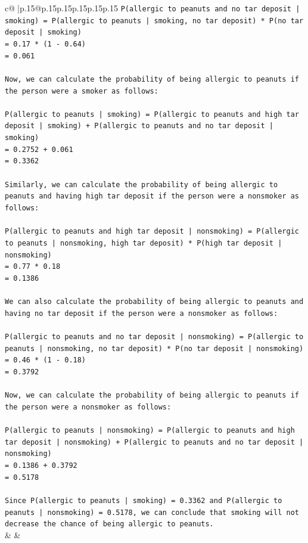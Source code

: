 \documentclass{article}
\begin{document}
{\begin{supertabular}{c@{$\;$}|p{.15\linewidth}@{}p{.15\linewidth}p{.15\linewidth}p{.15\linewidth}p{.15\linewidth}p{.15\linewidth}}
{{{\texttt{P(allergic to peanuts and no tar deposit | smoking) = P(allergic to peanuts | smoking, no tar deposit) * P(no tar deposit | smoking)} \\
\texttt{= 0.17 * (1 {-} 0.64)} \\
\texttt{= 0.061} \\
\\ 
\texttt{Now, we can calculate the probability of being allergic to peanuts if the person were a smoker as follows:} \\
\\ 
\texttt{P(allergic to peanuts | smoking) = P(allergic to peanuts and high tar deposit | smoking) + P(allergic to peanuts and no tar deposit | smoking)} \\
\texttt{= 0.2752 + 0.061} \\
\texttt{= 0.3362} \\
\\ 
\texttt{Similarly, we can calculate the probability of being allergic to peanuts and having high tar deposit if the person were a nonsmoker as follows:} \\
\\ 
\texttt{P(allergic to peanuts and high tar deposit | nonsmoking) = P(allergic to peanuts | nonsmoking, high tar deposit) * P(high tar deposit | nonsmoking)} \\
\texttt{= 0.77 * 0.18} \\
\texttt{= 0.1386} \\
\\ 
\texttt{We can also calculate the probability of being allergic to peanuts and having no tar deposit if the person were a nonsmoker as follows:} \\
\\ 
\texttt{P(allergic to peanuts and no tar deposit | nonsmoking) = P(allergic to peanuts | nonsmoking, no tar deposit) * P(no tar deposit | nonsmoking)} \\
\texttt{= 0.46 * (1 {-} 0.18)} \\
\texttt{= 0.3792} \\
\\ 
\texttt{Now, we can calculate the probability of being allergic to peanuts if the person were a nonsmoker as follows:} \\
\\ 
\texttt{P(allergic to peanuts | nonsmoking) = P(allergic to peanuts and high tar deposit | nonsmoking) + P(allergic to peanuts and no tar deposit | nonsmoking)} \\
\texttt{= 0.1386 + 0.3792} \\
\texttt{= 0.5178} \\
\\ 
\texttt{Since P(allergic to peanuts | smoking) = 0.3362 and P(allergic to peanuts | nonsmoking) = 0.5178, we can conclude that smoking will not decrease the chance of being allergic to peanuts.} \\
            }
        }
    }
    & & \\ \\


\end{supertabular}}
\end{document}
